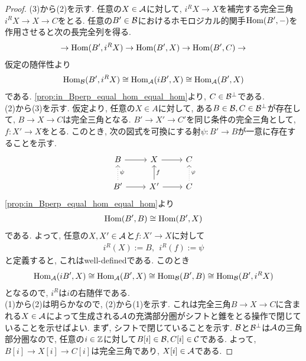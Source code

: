 \documentclass[uplatex, a4paper, 14Q, dvipdfmx]{jsarticle}
\begin{document}
\begin{proof}
  (3)から(2)を示す. 
  任意の$X \in \mathcal{A}$に対して, $i^RX \to X$を補完する完全三角$i^RX \to X \to C$をとる. 
  任意の$B' \in \mathcal{B}$におけるホモロジカル的関手$\mathrm{Hom}(B',-)$を作用させると次の長完全列を得る.
  \begin{align*}
    \to \mathrm{Hom}(B',i^RX) \to \mathrm{Hom}(B',X) \to \mathrm{Hom}(B',C) \to 
  \end{align*}
  仮定の随伴性より
  \begin{align*}
    \mathrm{Hom}_{\mathcal{B}}(B', i^RX) 
    \cong \mathrm{Hom}_{\mathcal{A}}(i B', X) 
    \cong \mathrm{Hom}_{\mathcal{A}}(B',X)
  \end{align*}
  である. 
  \cref{prop:in_Bperp_equal_hom_equal_hom}より, $C \in \mathcal{B}^\perp$である. \\
  (2)から(3)を示す. 
  仮定より, 任意の$X \in A$に対して, ある$B \in \mathcal{B}, C \in \mathcal{B}^\perp$が存在して, $B \to X \to C$は完全三角となる.  
  $B' \to X' \to C'$を同じ条件の完全三角として, $f : X' \to X$をとる. 
  このとき, 次の図式を可換にする射$\psi : B' \to B$が一意に存在することを示す. 
  \[\begin{tikzcd}
    B & X & C \\
    {B'} & {X'} & C
    \arrow[from=1-1, to=1-2]
    \arrow[from=1-2, to=1-3]
    \arrow[from=2-1, to=2-2]
    \arrow[from=2-2, to=2-3]
    \arrow["\psi"', dotted, from=2-1, to=1-1]
    \arrow["\varphi"', dotted, from=2-3, to=1-3]
    \arrow["f"', from=2-2, to=1-2]
  \end{tikzcd}\]
  \cref{prop:in_Bperp_equal_hom_equal_hom}より
  \begin{align*}
    \mathrm{Hom}(B',B) \cong \mathrm{Hom}(B',X)
  \end{align*}
  である. 
  よって, 任意の$X,X' \in \mathcal{A}$と$f: X' \to X$に対して
  \begin{align*}
    i^R(X) := B , ~~ i^R(f) := \psi
  \end{align*}
  と定義すると, これはwell-definedである. 
  このとき
  \begin{align*}
    \mathrm{Hom}_{\mathcal{A}}(i B', X) 
    \cong \mathrm{Hom}_{\mathcal{A}}(B',X) 
    \cong \mathrm{Hom}_{\mathcal{B}}(B',B)
    \cong \mathrm{Hom}_{\mathcal{B}}(B',i^RX)
  \end{align*}
  となるので, $i^R$は$i$の右随伴である. \\
  (1)から(2)は明らかなので, (2)から(1)を示す. 
  これは完全三角$B \to X \to C$に含まれる$X \in \mathcal{A}$によって生成される$\mathcal{A}$の充満部分圏がシフトと錐をとる操作で閉じていることを示せばよい. 
  まず, シフトで閉じていることを示す.
  $\mathcal{B}$と$\mathcal{B}^\perp$は$\mathcal{A}$の三角部分圏なので, 任意の$i \in \mathbb{Z}$に対して$B[i] \in \mathcal{B}, C[i] \in \mathcal{C}$である. 
  よって, $B[i] \to X[i] \to C[i]$は完全三角であり, $X[i] \in \mathcal{A}$である.

\end{proof}
\end{document}

